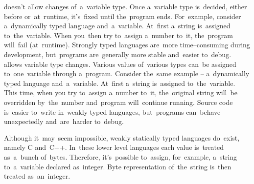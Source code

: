 \begin{itemize}
     doesn't allow changes of~a~variable type.
            Once a~variable type is~decided, either before or~at~runtime, it's~fixed until the~program ends.
            For~example, consider a~dynamically typed language and~a~variable.
            At~first a~string is~assigned to~the~variable.
            When you~then try to~assign a~number to~it, the~program will~fail (at~runtime).
            Strongly typed languages are~more time--consuming during development, but~programs are~generally more stable and~easier to~debug.
     allows variable type changes.
            Various values of~various types can~be assigned to~one~variable through a~program.
            Consider the~same example -- a~dynamically typed language and~a~variable.
            At~first a~string is~assigned to~the~variable.
            This time, when you try to~assign a~number to~it, the~original string will~be overridden by~the~number and~program will~continue running.
            Source code is~easier to~write in~weakly typed languages, but~programs can~behave unexpectedly and~are~harder to~debug.
\end{itemize}

\warning Although it~may~seem impossible, weakly statically typed languages do~exist, namely C and~C++.
In~these lower level languages each value is~treated as~a~bunch of~bytes.
Therefore, it's~possible to~assign, for~example, a~string to~a~variable declared as~integer.
Byte representation of~the~string is~then treated as~an~integer.
\newpage

